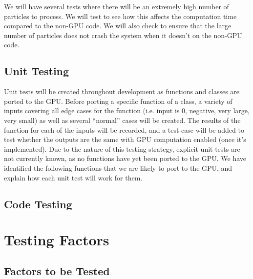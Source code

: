 \documentclass[12pt]{article}
\begin{document}
We will have several tests where there will be an extremely high number of particles to process. We will test to see how this affects the computation time compared to the non-GPU code. We will also check to ensure that the large number of particles does not crash the system when it doesn't on the non-GPU code.

\subsection{Unit Testing} %
Unit tests will be created throughout development as functions and classes are ported to the GPU. Before porting a specific function of a class, a variety of inputs covering all edge cases for the function (i.e. input is 0, negative, very large, very small) as well as several ``normal'' cases will be created. The results of the function for each of the inputs will be recorded, and a test case will be added to test whether the outputs are the same with GPU computation enabled (once it's implemented). Due to the nature of this testing strategy, explicit unit tests are not currently known, as no functions have yet been ported to the GPU. We have identified the following functions that we are likely to port to the GPU, and explain how each unit test will work for them.

\begin{table}[h]

\end{table}

\subsection{Code Testing} %

\section{Testing Factors}

\subsection{Factors to be Tested} %

\end{document}
